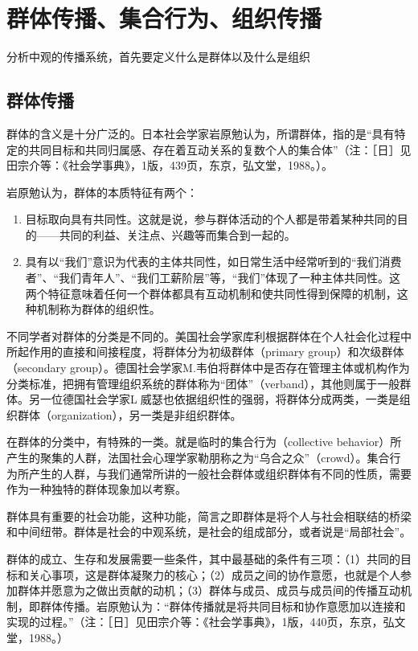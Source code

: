 \documentclass[UTF8,12pt]{ctexart}
\numberwithin{equation}{section} %
\numberwithin{figure}{section}
\numberwithin{table}{section}
\begin{document}
	\newpage
	
	\section{群体传播、集合行为、组织传播}
	分析中观的传播系统，首先要定义什么是群体以及什么是组织
	
	\subsection{群体传播}
	群体的含义是十分广泛的。日本社会学家岩原勉认为，所谓群体，指的是“具有特定的共同目标和共同归属感、存在着互动关系的复数个人的集合体”（注：［日］见田宗介等：《社会学事典》，1版，439页，东京，弘文堂，1988。）。
	
	岩原勉认为，群体的本质特征有两个：
	\begin{enumerate}
		\item 目标取向具有共同性。这就是说，参与群体活动的个人都是带着某种共同的目的——共同的利益、关注点、兴趣等而集合到一起的。
		
		\item 具有以“我们”意识为代表的主体共同性，如日常生活中经常听到的“我们消费者”、“我们青年人”、“我们工薪阶层”等，“我们”体现了一种主体共同性。这两个特征意味着任何一个群体都具有互动机制和使共同性得到保障的机制，这种机制称为群体的组织性。
		
	\end{enumerate}
	
	不同学者对群体的分类是不同的。美国社会学家库利根据群体在个人社会化过程中所起作用的直接和间接程度，将群体分为初级群体（primary group）和次级群体（secondary group）。德国社会学家M.韦伯将群体中是否存在管理主体或机构作为分类标准，把拥有管理组织系统的群体称为“团体”（verband），其他则属于一般群体。另一位德国社会学家L威瑟也依据组织性的强弱，将群体分成两类，一类是组织群体（organization），另一类是非组织群体。
	
	在群体的分类中，有特殊的一类。就是临时的集合行为（collective behavior）所产生的聚集的人群，法国社会心理学家勒朋称之为“乌合之众”（crowd）。集合行为所产生的人群，与我们通常所讲的一般社会群体或组织群体有不同的性质，需要作为一种独特的群体现象加以考察。

	
	群体具有重要的社会功能，这种功能，简言之即群体是将个人与社会相联结的桥梁和中间纽带。群体是社会的中观系统，是社会的组成部分，或者说是“局部社会”。
	
	群体的成立、生存和发展需要一些条件，其中最基础的条件有三项：（1）共同的目标和关心事项，这是群体凝聚力的核心；（2）成员之间的协作意愿，也就是个人参加群体并愿意为之做出贡献的动机；（3）群体与成员、成员与成员间的传播互动机制，即群体传播。岩原勉认为：“群体传播就是将共同目标和协作意愿加以连接和实现的过程。”（注：［日］见田宗介等：《社会学事典》，1版，440页，东京，弘文堂，1988。）
	
\end{document}
